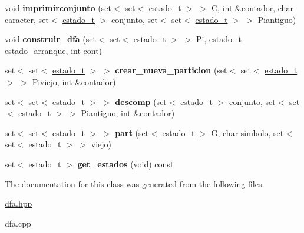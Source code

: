\begin{DoxyCompactItemize}
\hypertarget{classdfa__t_acb326e2aa39bdcaaf777f27f7892d728}{}\label{classdfa__t_acb326e2aa39bdcaaf777f27f7892d728} 
void {\bfseries imprimirconjunto} (set$<$ set$<$ \hyperlink{classestado__t}{estado\+\_\+t} $>$ $>$ C, int \&contador, char caracter, set$<$ \hyperlink{classestado__t}{estado\+\_\+t} $>$ conjunto, set$<$ set$<$ \hyperlink{classestado__t}{estado\+\_\+t} $>$ $>$ Piantiguo)
\item 
\hypertarget{classdfa__t_ade109fa3f2db54e7fe49172bd890540e}{}\label{classdfa__t_ade109fa3f2db54e7fe49172bd890540e} 
void {\bfseries construir\+\_\+dfa} (set$<$ set$<$ \hyperlink{classestado__t}{estado\+\_\+t} $>$ $>$ Pi, \hyperlink{classestado__t}{estado\+\_\+t} estado\+\_\+arranque, int cont)
\item 
\hypertarget{classdfa__t_a3a67953e49f03d2312b41109c761f108}{}\label{classdfa__t_a3a67953e49f03d2312b41109c761f108} 
set$<$ set$<$ \hyperlink{classestado__t}{estado\+\_\+t} $>$ $>$ {\bfseries crear\+\_\+nueva\+\_\+particion} (set$<$ set$<$ \hyperlink{classestado__t}{estado\+\_\+t} $>$ $>$ Piviejo, int \&contador)
\item 
\hypertarget{classdfa__t_a74f9e027e7cab94e023c37eda0576ce2}{}\label{classdfa__t_a74f9e027e7cab94e023c37eda0576ce2} 
set$<$ set$<$ \hyperlink{classestado__t}{estado\+\_\+t} $>$ $>$ {\bfseries descomp} (set$<$ \hyperlink{classestado__t}{estado\+\_\+t} $>$ conjunto, set$<$ set$<$ \hyperlink{classestado__t}{estado\+\_\+t} $>$ $>$ Piantiguo, int \&contador)
\item 
\hypertarget{classdfa__t_a829a49840af3df7c76c320568dfdafe6}{}\label{classdfa__t_a829a49840af3df7c76c320568dfdafe6} 
set$<$ set$<$ \hyperlink{classestado__t}{estado\+\_\+t} $>$ $>$ {\bfseries part} (set$<$ \hyperlink{classestado__t}{estado\+\_\+t} $>$ G, char simbolo, set$<$ set$<$ \hyperlink{classestado__t}{estado\+\_\+t} $>$ $>$ viejo)
\item 
\hypertarget{classdfa__t_ae0970a02c848331411ae8bc6776ddc7e}{}\label{classdfa__t_ae0970a02c848331411ae8bc6776ddc7e} 
set$<$ \hyperlink{classestado__t}{estado\+\_\+t} $>$ {\bfseries get\+\_\+estados} (void) const
\end{DoxyCompactItemize}


The documentation for this class was generated from the following files\+:\begin{DoxyCompactItemize}
\item 
\hyperlink{dfa_8hpp}{dfa.\+hpp}\item 
dfa.\+cpp\end{DoxyCompactItemize}
